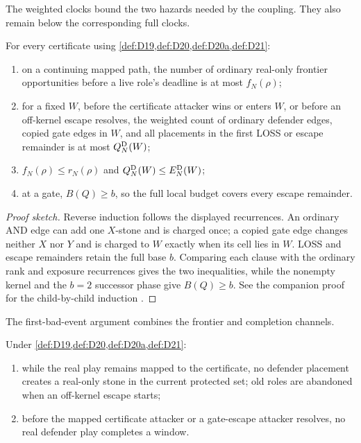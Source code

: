 The weighted clocks bound the two hazards needed by the coupling.  They also
remain below the corresponding full clocks.

\begin{lemma}
\label{lem:L16}
For every certificate using \cref{def:D19,def:D20,def:D20a,def:D21}:
\begin{enumerate}[label=\textup{(\arabic*)}]
  \item on a continuing mapped path, the number of ordinary real-only
  frontier opportunities before a live role's deadline is at most
  $f_N(\rho)$;
  \item for a fixed $W$, before the certificate attacker wins or enters $W$,
  or before an off-kernel escape resolves, the weighted count of ordinary
  defender edges, copied gate edges in $W$, and all placements in the first
  LOSS or escape remainder is at most $Q_N^{\mathrm{D}}(W)$;
  \item $f_N(\rho)\le r_N(\rho)$ and $Q_N^{\mathrm{D}}(W)\le E_N^{\mathrm{D}}(W)$;
  \item at a gate, $B(Q)\ge b$, so the full local budget covers every escape
  remainder.
\end{enumerate}
\end{lemma}

\begin{proof}[Proof sketch]
Reverse induction follows the displayed recurrences.  An ordinary AND edge
can add one $X$-stone and is charged once; a copied gate edge changes neither
$X$ nor $Y$ and is charged to $W$ exactly when its cell lies in $W$.  LOSS
and escape remainders retain the full base $b$.  Comparing each clause with
the ordinary rank and exposure recurrences gives the two inequalities, while
the nonempty kernel and the $b=2$ successor phase give $B(Q)\ge b$.
See the companion proof for the child-by-child induction
\cite{hexobot-companions}.
\end{proof}

The first-bad-event argument combines the frontier and completion channels.

\begin{lemma}
\label{lem:L17}
Under \cref{def:D19,def:D20,def:D20a,def:D21}:
\begin{enumerate}[label=\textup{(\arabic*)}]
  \item while the real play remains mapped to the certificate, no defender
  placement creates a real-only stone in the current protected set; old roles
  are abandoned when an off-kernel escape starts;
  \item before the mapped certificate attacker or a gate-escape attacker
  resolves, no real defender play completes a window.
\end{enumerate}
\end{lemma}

